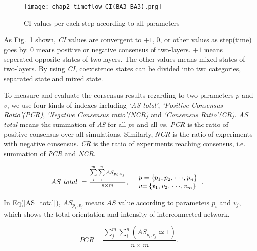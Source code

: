 \begin{figure}[!htb]
	\centering
	\texttt{[image: chap2\_timeflow\_CI(BA3\_BA3).png]}
	\caption{CI values per each step according to all parameters}
	\label{chap2_timeflow_CI(BA3_BA3)}
\end{figure}

As Fig.~\ref{chap2_timeflow_CI(BA3_BA3)} shown, \textit{CI} values are convergent to $+1$, $0$, or other values as step(time) goes by. $0$ means positive or negative consensus of two-layers. $+1$ means seperated opposite states of two-layers. The other values means mixed states of two-layers. By using \textit{CI}, coexistence states can be divided into two categories, separated state and mixed state. 

To measure and evaluate the consensus results regarding to two parameters $p$ and $v$, we use four kinds of indexes including \textit{`AS total'}, \textit{`Positive Consensus Ratio'(PCR)}, \textit{`Negative Consensus ratio'(NCR)} and \textit{`Consensus Ratio'(CR)}. \textit{AS total} means the summation of \textit{AS} for all $p$s and all $v$s. \textit{PCR} is the ratio of positive consensus over all simulations. Similarly, \textit{NCR} is the ratio of experiments with negative consensus. \textit{CR} is the ratio of experiments reaching consensus, i.e. summation of \textit{PCR} and \textit{NCR}.

\begin{equation}
\begin{array}{cl}
AS\mbox{ \textit{total} } = \frac{{\sum\limits_j^m {\sum\limits_i^n {A{S_{{p _i},{v _j}}}} } }}{{n \times m }}, &
\begin{array}{l}
p  = \left\{ {{p _{\rm{1}}},{p _{\rm{2}}},\left. {\cdot\cdot\cdot,{p _n}} \right\}} \right.\\
v {\rm{ = }}\left\{ {{v _{\rm{1}}},{v _{\rm{2}}},\left. {\cdot\cdot\cdot,{v _m}} \right\}} \right.
\end{array}.\
\end{array}
\label{AS_total}
\end{equation}

In Eq(\ref{AS_total}), ${A{S_{{p _i},{v _j}}}}$ means $AS$ value according to parameters $p_i$ and $v_j$, which shows the total orientation and intensity of interconnected network.

\begin{equation}
PCR = \frac{{\sum\limits_j^m {\sum\limits_i^n {(A{S_{{p _i},{v _j}}} \simeq  1)} } }}{{n \times m}}.
\label{PCR}
\end{equation}

